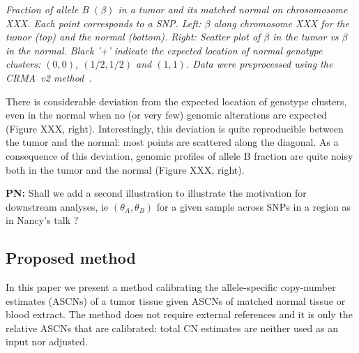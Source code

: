 \documentclass[10pt]{bmc_article}
\newenvironment{bmcformat}{\fussy\setboolean{publ}{true}}{\fussy}
\newenvironment{PN}{\color{blue}\textbf{PN:}}{}
\begin{document}
\begin{bmcformat}
\emph{Fraction of allele B $(\beta)$ in a tumor and its matched normal on chrosomosome XXX. Each point corresponds to a SNP. Left: $\beta$  along chromosome XXX for the tumor (top) and the normal (bottom). Right: Scatter plot of $\beta$ in the tumor vs $\beta$ in the normal. Black '+' indicate the expected location of normal genotype clusters: $(0,0)$, $(1/2,1/2)$ and $(1,1)$. Data were preprocessed using the CRMA~v2 method~\cite{BengtssonH_etal_2009b}.
}

There is considerable deviation from the expected location of genotype clusters, even in the normal when no (or very few) genomic alterations are expected (Figure XXX, right). Interestingly, this deviation is quite reproducible between the tumor and the normal: most points are scattered along the diagonal. As a consequence of this deviation, genomic profiles of allele B fraction are quite noisy both in the tumor and the normal (Figure XXX, right). 

\begin{PN}
  Shall we add a second illustration to illustrate the motivation for downstream analyses, ie  $(\theta_A,\theta_B)$ for a given sample across SNPs in a region as in Nancy's talk ?
\end{PN}

\subsection*{Proposed method}

In this paper we present a method calibrating the allele-specific copy-number estimates (ASCNs) of a tumor tissue given ASCNs of matched normal tissue or blood extract.  The method does not require external references and it is only the relative ASCNs that are calibrated: total CN estimates are neither used as an input nor adjusted.


\end{bmcformat}
\end{document}

